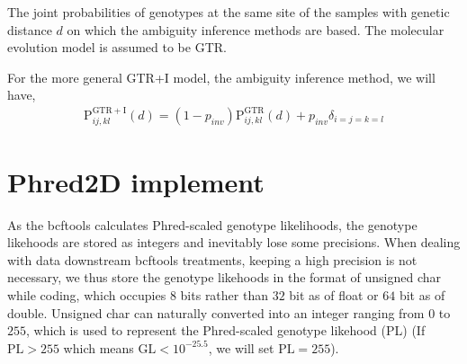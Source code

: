 \documentclass{article}
\begin{document}
\begin{table}[h]
\caption{The joint probabilities of genotypes at the same site of the samples with genetic distance $d$ on which the ambiguity inference methods are based. The molecular evolution model is assumed to be GTR.}
\label{tab:Amb}
\end{table}

For the more general GTR+I model, the ambiguity inference method, we will have,
\begin{align*}
\mathrm{P}_{ij,kl}^{\mathrm{GTR+I}}(d)=\left(1-p_{inv}\right)\mathrm{P}_{ij,kl}^{\mathrm{GTR}}(d)+p_{inv}\delta_{i=j=k=l}
\end{align*}

\section{Phred2D implement}
As the bcftools calculates Phred-scaled genotype likelihoods, the genotype likehoods are stored as integers and inevitably lose some precisions. When dealing with data downstream bcftools treatments, keeping a high precision is not necessary, we thus store the genotype likehoods in the format of unsigned char while coding, which occupies $8$ bits rather than $32$ bit as of float or $64$ bit as of double. Unsigned char can naturally converted into an integer ranging from $0$ to $255$, which is used to represent the Phred-scaled genotype likehood (PL) (If $\mathrm{PL}>255$ which means $\mathrm{GL}<10^{-25.5}$, we will set $\mathrm{PL}=255$).
\end{document}
